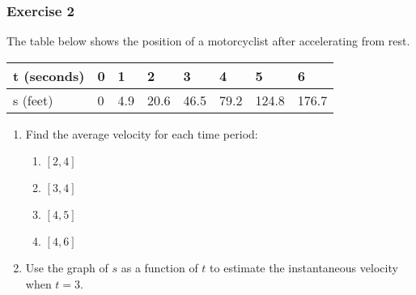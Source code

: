 \documentclass[12pt]{beamer}
\begin{document}
\begin{frame}
	\frametitle{Exercise 2}
	\vspace*{\fill}
	\initclock
	The table below shows the position of a motorcyclist after accelerating from rest.
	\begin{table}[]
		\begin{tabular}{l|l|l|l|l|l|l|l}
			t (seconds) & 0 & 1   & 2    & 3    & 4    & 5     & 6     \\ \hline
			s (feet)    & 0 & 4.9 & 20.6 & 46.5 & 79.2 & 124.8 & 176.7
		\end{tabular}
	\end{table}
	\vspace*{\fill}
	\vspace*{\fill}
	\begin{enumerate}
		\item Find the average velocity for each time period:
		      \begin{multicols}{4}
			      \begin{enumerate}
				      \item $[2, 4]$
				      \item $[3, 4]$
				      \item $[4, 5]$
				      \item $[4, 6]$
			      \end{enumerate}
		      \end{multicols}
		      \vspace*{\fill}
		\item Use the graph of $s$ as a function of $t$ to estimate the instantaneous velocity when $t=3$. %
	\end{enumerate}
	\vspace*{\fill}
	\vspace*{\fill}
	\vspace*{\fill}
	\vspace*{\fill}
	\crono
\end{frame}
\end{document}
